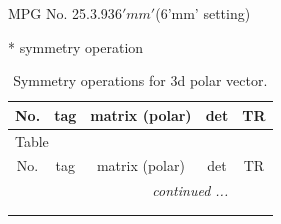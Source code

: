 \documentclass[fleqn,8pt]{jsarticle}
\begin{document}
\setcounter{MaxMatrixCols}{32}

\renewcommand{\tablename}{Table~}
\renewcommand{\figurename}{Figure~}
\begin{center}
\LARGE
MPG No. 25.3.93\quad$6'mm'$\quad(6'mm' setting)
\end{center}
* symmetry operation
\renewcommand{\arraystretch}{1.3}
\begin{longtable}{ccccc}
\caption{Symmetry operations for 3d polar vector.}
 \\
 \hline \hline
No. & tag & matrix (polar) & det & TR \\ \hline \endfirsthead

\multicolumn{4}{l}{\tablename\ \thetable{}} \\
 \hline \hline
No. & tag & matrix (polar) & det & TR \\ \hline \endhead

 \hline \hline
\multicolumn{4}{r}{\footnotesize\it continued ...} \\ \endfoot

 \hline \hline
\multicolumn{4}{r}{} \\ \endlastfoot


\end{longtable}
\end{document}
